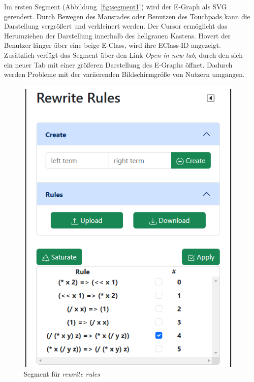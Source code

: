 Im ersten Segment (Abbildung~\ref{fig:segment1}) wird der E-Graph als SVG gerendert. Durch Bewegen des Mausrades oder Benutzen des Touchpads kann die Darstellung vergrößert und verkleinert werden.
Der Cursor ermöglicht das Herumziehen der Darstellung innerhalb des hellgrauen Kastens. Hovert der Benutzer länger über eine beige E-Class, wird ihre EClass-ID angezeigt.
Zusätzlich verfügt das Segment über den Link \textit{Open in new tab}, durch den
sich ein neuer Tab mit einer größeren Darstellung des E-Graphs öffnet. Dadurch werden Probleme mit der variierenden Bildschirmgröße von Nutzern umgangen.

\begin{figure}
    \vspace{-10mm}
    \begin{center}
      \includegraphics[scale=0.6]{../fig/rewriterulecontrol.png}
    \end{center}
    \caption{Segment für \textit{rewrite rules}}
    \label{fig:segment2}
\end{figure}

